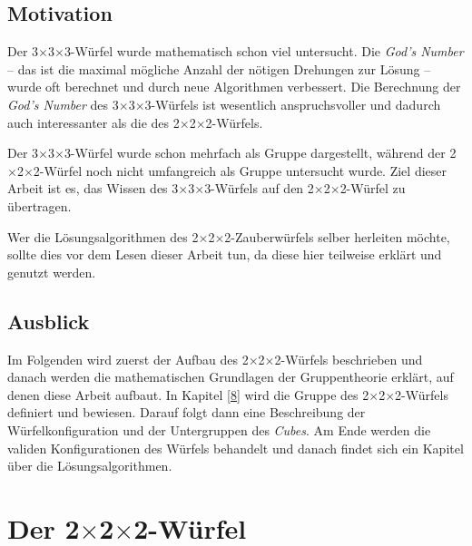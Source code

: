 \documentclass[12pt,a4paper, usenames, dvipsnames]{article}
\theoremstyle{mystyle}
\theoremstyle{definition}
\newcommand{\Ttwo}{2$\times$2$\times$2-}
\newcommand{\Tthree}{3$\times$3$\times$3-}
\begin{document}
%
%
%
%
%
%
%
%
\subsection*{Motivation} 




Der \Tthree Würfel wurde mathematisch schon viel untersucht. 
Die \textit{God's Number} -- das ist die maximal mögliche Anzahl der nötigen Drehungen zur Lösung -- wurde oft berechnet und durch neue Algorithmen verbessert. 
Die Berechnung der \textit{God's Number} des \Tthree Würfels ist wesentlich anspruchsvoller und dadurch auch interessanter als die des \Ttwo Würfels. 

Der \Tthree Würfel wurde schon mehrfach als Gruppe dargestellt, während der \Ttwo Würfel
noch nicht umfangreich als Gruppe untersucht wurde. Ziel dieser Arbeit ist es, das Wissen des \Tthree Würfels auf den \Ttwo Würfel zu übertragen.

Wer die Lösungsalgorithmen des \Ttwo Zauberwürfels selber herleiten möchte, sollte dies vor dem Lesen dieser Arbeit tun, da diese hier teilweise erklärt und genutzt werden.

%
%
%
%
%
%
%
%
\subsection*{Ausblick} 

Im Folgenden wird zuerst der Aufbau des \Ttwo Würfels beschrieben und danach werden die mathematischen Grundlagen der Gruppentheorie erklärt, auf denen diese Arbeit aufbaut. 
In Kapitel \ref{8} wird die Gruppe des \Ttwo Würfels definiert und bewiesen. 
Darauf folgt dann eine Beschreibung der Würfelkonfiguration und der Untergruppen des \textit{Cubes}. 
Am Ende werden die validen Konfigurationen des Würfels behandelt und danach findet sich ein Kapitel über die Lösungsalgorithmen.

%
%
%
%
%
%
%
%
%
%
%
%
\newpage
\section{Der \Ttwo Würfel}
\end{document}
